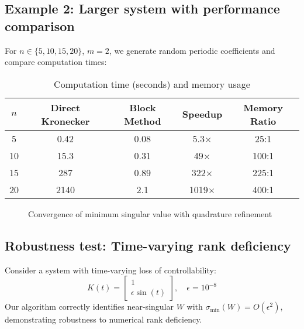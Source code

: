 \documentclass[5p,times]{elsarticle} %
\begin{document}
\subsection{Example 2: Larger system with performance comparison}
For \(n\in\{5,10,15,20\}\), \(m=2\), we generate random periodic coefficients and compare computation times:
\begin{table}[h]
\centering
\caption{Computation time (seconds) and memory usage}
\label{tab:performance}
\begin{tabular}{ccccc}
\toprule
\(n\) & Direct Kronecker & Block Method & Speedup & Memory Ratio \\
\midrule
5 & 0.42 & 0.08 & 5.3× & 25:1 \\
10 & 15.3 & 0.31 & 49× & 100:1 \\
15 & 287 & 0.89 & 322× & 225:1 \\
20 & 2140 & 2.1 & 1019× & 400:1 \\
\bottomrule
\end{tabular}
\end{table}

\begin{figure}[H]
\centering
{}
\caption{Convergence of minimum singular value with quadrature refinement}
\label{fig:convergence}
\end{figure}

\subsection{Robustness test: Time-varying rank deficiency}
Consider a system with time-varying loss of controllability:
\[
K(t) = \begin{bmatrix} 1 \\ \epsilon\sin(t) \end{bmatrix}, \quad \epsilon = 10^{-8}
\]
Our algorithm correctly identifies near-singular \(W\) with \(\sigma_{\min}(W) = O(\epsilon^2)\), demonstrating robustness to numerical rank deficiency.
\end{document}
